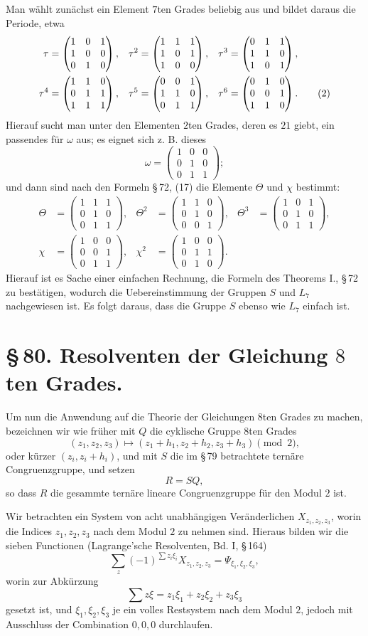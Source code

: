 \documentclass[11pt]{article}
\providecommand{\mmat}[9]{\begin{pmatrix}#1&#2&#3\\#4&#5&#6\\#7&#8&#9\end{pmatrix}}
\providecommand{\mmat}[9]{\begin{pmatrix}#1&#2&#3\\#4&#5&#6\\#7&#8&#9\end{pmatrix}}
\begin{document}
Man wählt zunächst ein Element $7$ten Grades beliebig aus und bildet daraus die Periode, etwa
\begin{align}
 \tau&=\mmat{1}{0}{1}{1}{0}{0}{0}{1}{0},&
 \tau^2&=\mmat{1}{1}{1}{1}{0}{1}{1}{0}{0},&
 \tau^3&=\mmat{0}{1}{1}{1}{1}{0}{1}{0}{1},\notag\\
 \tau^4&=\mmat{1}{1}{0}{0}{1}{1}{1}{1}{1},&
 \tau^5&=\mmat{0}{0}{1}{1}{1}{0}{0}{1}{1},&
 \tau^6&=\mmat{0}{1}{0}{0}{0}{1}{1}{1}{0}.
 \tag{2}
\end{align}
Hierauf sucht man unter den Elementen $2$ten Grades, deren es $21$ giebt, ein passendes für $\omega$ aus; es eignet sich z. B. dieses
\begin{equation}
 \omega=\mmat{1}{0}{0}{0}{1}{0}{0}{1}{1};
 \tag{3}
\end{equation}
und dann sind nach den Formeln \S\,72, (17) die Elemente $\Theta$ und $\chi$ bestimmt:
\begin{align}
 \Theta&=\mmat{1}{1}{1}{0}{1}{0}{0}{1}{1},&
 \Theta^2&=\mmat{1}{1}{0}{0}{1}{0}{0}{0}{1},&
 \Theta^3&=\mmat{1}{0}{1}{0}{1}{0}{0}{1}{1},
 \tag{4}\\
 \chi&=\mmat{1}{0}{0}{0}{0}{1}{0}{1}{1},&
 \chi^2&=\mmat{1}{0}{0}{0}{1}{1}{0}{1}{0}.
 \tag{5}
\end{align}
Hierauf ist es Sache einer einfachen Rechnung, die Formeln des Theorems I., \S\,72 zu bestätigen, wodurch die Uebereinstimmung der Gruppen $S$ und $L_7$ nachgewiesen ist. Es folgt daraus, dass die Gruppe $S$ ebenso wie $L_7$ einfach ist.

\section*{\S\,80. Resolventen der Gleichung $8$ten Grades.}

Um nun die Anwendung auf die Theorie der Gleichungen $8$ten Grades zu machen, bezeichnen wir wie früher mit $Q$ die cyklische Gruppe $8$ten Grades
\[
 (z_1,z_2,z_3)\longmapsto (z_1+h_1,z_2+h_2,z_3+h_3)\pmod 2,
\]
oder kürzer $(z_i,z_i+h_i)$, und mit $S$ die im \S\,79 betrachtete ternäre Congruenzgruppe, und setzen
\[
 R=SQ,
\]
so dass $R$ die gesammte ternäre lineare Congruenzgruppe für den Modul $2$ ist.

Wir betrachten ein System von acht unabhängigen Veränderlichen $X_{z_1,z_2,z_3}$, worin die Indices $z_1,z_2,z_3$ nach dem Modul $2$ zu nehmen sind. Hieraus bilden wir die sieben Functionen (Lagrange'sche Resolventen, Bd. I, \S\,164)
\begin{equation}
 \sum_z (-1)^{\sum z_i\xi_i}X_{z_1,z_2,z_3}=\Psi_{\xi_1,\xi_2,\xi_3},
 \tag{1}
\end{equation}
worin zur Abkürzung
\[
 \sum z\xi=z_1\xi_1+z_2\xi_2+z_3\xi_3
\]
gesetzt ist, und $\xi_1,\xi_2,\xi_3$ je ein volles Restsystem nach dem Modul $2$, jedoch mit Ausschluss der Combination $0,0,0$ durchlaufen.
\end{document}
